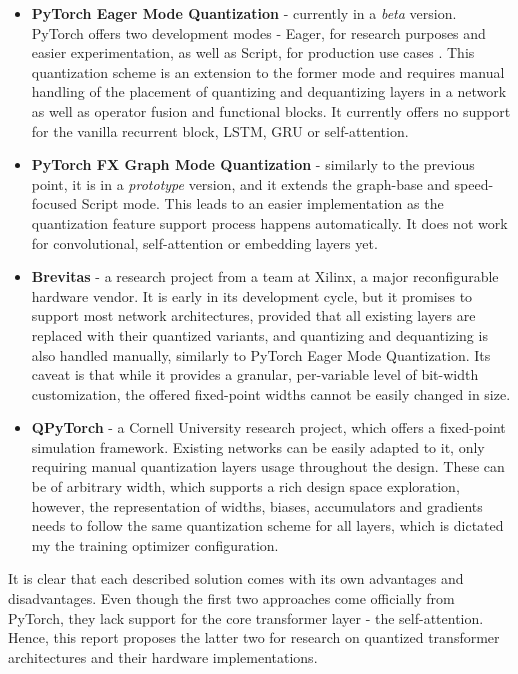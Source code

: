 \begin{itemize}
  \item \textbf{PyTorch Eager Mode Quantization} \cite{77-krishnamoorthistatic} - currently in a \textit{beta} version. PyTorch offers two development modes - Eager, for research purposes and easier experimentation, as well as Script, for production use cases \cite{79-sharmapytorch}. This quantization scheme is an extension to the former mode and requires manual handling of the placement of quantizing and dequantizing layers in a network as well as operator fusion and functional blocks. It currently offers no support for the vanilla recurrent block, LSTM, GRU or self-attention.

  \item \textbf{PyTorch FX Graph Mode Quantization} \cite{78-zhangfx} - similarly to the previous point, it is in a \textit{prototype} version, and it extends the graph-base and speed-focused Script mode. This leads to an easier implementation as the quantization feature support process happens automatically. It does not work for convolutional, self-attention or embedding layers yet.

  \item \textbf{Brevitas} \cite{brevitas} - a research project from a team at Xilinx, a major reconfigurable hardware vendor. It is early in its development cycle, but it promises to support most network architectures, provided that all existing layers are replaced with their quantized variants, and quantizing and dequantizing is also handled manually, similarly to PyTorch Eager Mode Quantization. Its caveat is that while it provides a granular, per-variable level of bit-width customization, the offered fixed-point widths cannot be easily changed in size.

  \item \textbf{QPyTorch} \cite{zhang2019qpytorch} - a Cornell University research project, which offers a fixed-point simulation framework. Existing networks can be easily adapted to it, only requiring manual quantization layers usage throughout the design. These can be of arbitrary width, which supports a rich design space exploration, however, the representation of widths, biases, accumulators and gradients needs to follow the same quantization scheme for all layers, which is dictated my the training optimizer configuration.
\end{itemize}

It is clear that each described solution comes with its own advantages and disadvantages. Even though the first two approaches come officially from PyTorch, they lack support for the core transformer layer - the self-attention. Hence, this report proposes the latter two for research on quantized transformer architectures and their hardware implementations.

